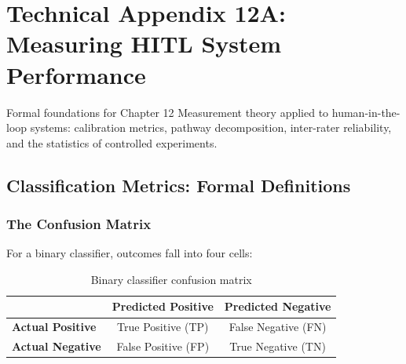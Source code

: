 
\chapter*{Technical Appendix 12A: Measuring HITL System Performance}

\begin{chapterquote}{Formal foundations for Chapter 12}
Measurement theory applied to human-in-the-loop systems: calibration metrics, pathway decomposition, inter-rater reliability, and the statistics of controlled experiments.
\end{chapterquote}

\apxnumon
\section{Classification Metrics: Formal Definitions}

\subsection{The Confusion Matrix}

For a binary classifier, outcomes fall into four cells:

\begin{table}[htbp]
\centering
\caption{Binary classifier confusion matrix}
\label{tab:confusion-matrix}
\begin{tabular}{@{}lcc@{}}
\toprule
 & \textbf{Predicted Positive} & \textbf{Predicted Negative} \\
\midrule
\textbf{Actual Positive} & True Positive (TP) & False Negative (FN) \\
\textbf{Actual Negative} & False Positive (FP) & True Negative (TN) \\
\bottomrule
\end{tabular}
\end{table}

